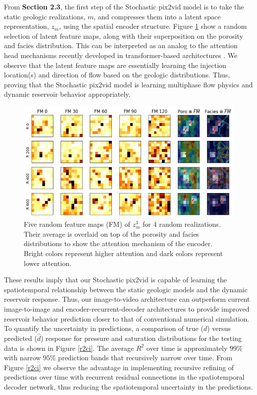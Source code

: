 \documentclass[10pt, twoside]{article}
\begin{document}
From \textbf{Section 2.3}, the first step of the Stochastic pix2vid model is to take the static geologic realizations, $m$, and compresses them into a latent space representation, $z_m$, using the spatial encoder structure. Figure \ref{feature_maps} show a random selection of latent feature maps, along with their superposition on the porosity and facies distribution. This can be interpreted as an analog to the attention head mechanisms recently developed in transformer-based architectures \cite{vaswani2017attention}. We observe that the latent feature maps are essentially learning the injection location(s) and direction of flow based on the geologic distributions. Thus, proving that the Stochastic pix2vid model is learning multiphase flow physics and dynamic reservoir behavior appropriately.

\begin{figure}
    \centering
    \includegraphics[width=16cm]{figures/feature_maps.png}
    \caption{Five random feature maps (FM) of $z_m^3$ for 4 random realizations. Their average is overlaid on top of the porosity and facies distributions to show the attention mechanism of the encoder. Bright colors represent higher attention and dark colors represent lower attention.}
    \label{feature_maps}
\end{figure}

These results imply that our Stochastic pix2vid is capable of learning the spatiotemporal relationship between the static geologic models and the dynamic reservoir response. Thus, our image-to-video architecture can outperform current image-to-image and encoder-recurrent-decoder architectures to provide improved reservoir behavior prediction closer to that of conventional numerical simulation. To quantify the uncertainty in predictions, a comparison of true ($d$) versus predicted ($\hat{d}$) response for pressure and saturation distributions for the testing data is shown in Figure \ref{r2ci}. The average $R^2$ over time is approximately $99\%$ with narrow $95\%$ prediction bands that recursively narrow over time. From Figure \ref{r2ci} we observe the advantage in implementing recursive refining of predictions over time with recurrent residual connections in the spatiotemporal decoder network, thus reducing the spatiotemporal uncertainty in the predictions.
\end{document}
